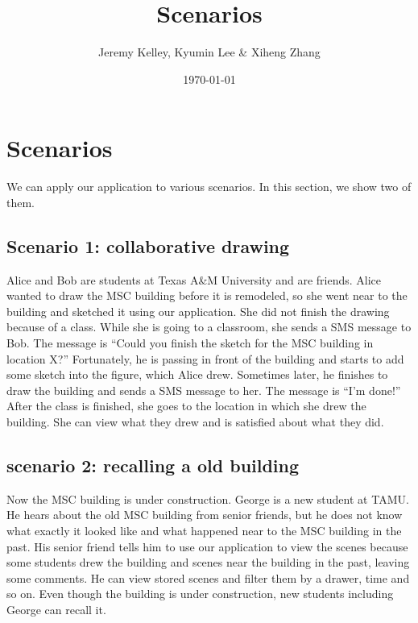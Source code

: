 \documentclass{article}
\begin{document}
\setlength{\parindent}{0pt}
\setlength{\parskip}{.5ex plus 0.5ex minus 0.2ex}




\title{ Scenarios }

\author{ Jeremy Kelley, Kyumin Lee \& Xiheng Zhang }

\date{\today}

\maketitle

\section{Scenarios}
We can apply our application to various scenarios. In this section, we show two of them.   

\subsection{Scenario 1: collaborative drawing}

Alice and Bob are students at Texas A\&M University and are friends. Alice wanted to draw the MSC building before it is remodeled, so she went near to the building and sketched it using our application. She did not finish the drawing because of a class. While she is going to a classroom, she sends a SMS message to Bob. The message is ``Could you finish the sketch for the MSC building in location X?'' Fortunately, he is passing in front of the building and starts to add some sketch into the figure, which Alice drew. Sometimes later, he finishes to draw the building and sends a SMS message to her. The message is ``I'm done!'' After the class is finished, she goes to the location in which she drew the building. She can view what they drew and is satisfied about what they did.

\subsection{scenario 2: recalling a old building}

Now the MSC building is under construction. George is a new student at TAMU. He hears about the old MSC building from senior friends, but he does not know what exactly it looked like and what happened near to the MSC building in the past. His senior friend tells him to use our application to view the scenes because some students drew the building and scenes near the building in the past, leaving some comments. He can view stored scenes and filter them by a drawer, time and so on. Even though the building is under construction, new students including George can recall it.
\end{document}
